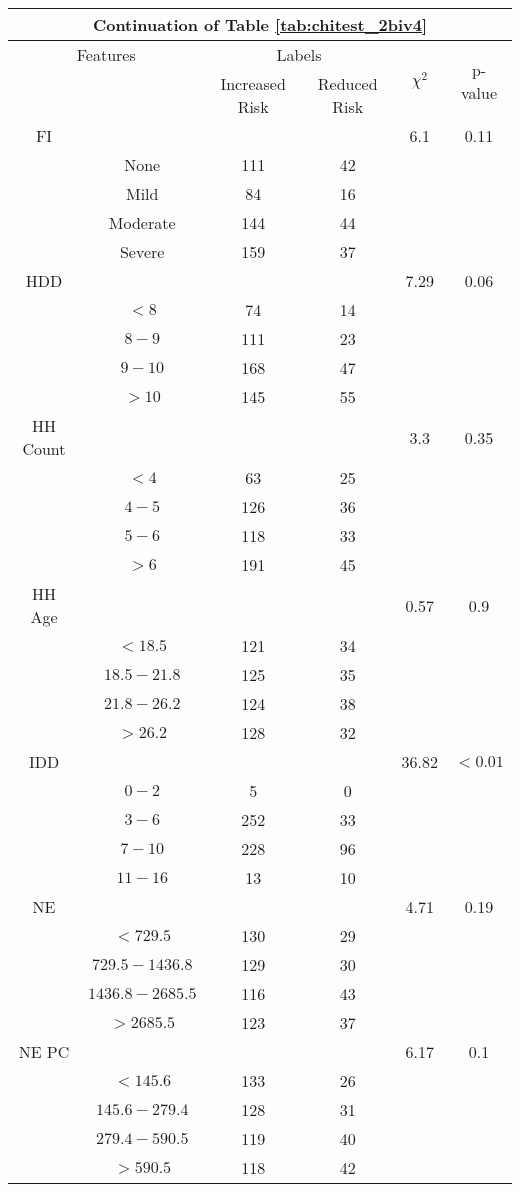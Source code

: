 \begin{table}
\centering
\label{tab:chitest_2biv4_cont}
\begin{tabular}{c c | c c| c | c}
\hline
\multicolumn{6}{c}{Continuation of Table \ref{tab:chitest_2biv4}}\\ 
\hline
\multicolumn{2}{c|}{Features}& \multicolumn{2}{c|}{Labels}& \multirow{2}{*}{$\chi^2$} & \multirow{2}{*}{p-value}\\ 
& & Increased Risk & Reduced Risk & & \\ 
\hline
FI &  &  & & 6.1 & 0.11 \\ 
& None & 111 & 42& & \\ 
& Mild & 84 & 16& & \\ 
& Moderate & 144 & 44& & \\ 
& Severe & 159 & 37& & \\ 
\hline 
HDD &  &  & & 7.29 & 0.06 \\ 
& $< 8$ & 74 & 14& & \\ 
& $8-9$ & 111 & 23& & \\ 
& $9-10$ & 168 & 47& & \\ 
& $> 10$ & 145 & 55& & \\ 
\hline 
HH Count &  &  & & 3.3 & 0.35 \\ 
& $< 4$ & 63 & 25& & \\ 
& $4-5$ & 126 & 36& & \\ 
& $5-6$ & 118 & 33& & \\ 
& $> 6$ & 191 & 45& & \\ 
\hline 
HH Age &  &  & & 0.57 & 0.9 \\ 
& $< 18.5$ & 121 & 34& & \\ 
& $18.5-21.8$ & 125 & 35& & \\ 
& $21.8-26.2$ & 124 & 38& & \\ 
& $> 26.2$ & 128 & 32& & \\ 
\hline 
IDD &  &  & & 36.82 & $< 0.01$ \\ 
& $0-2$ & 5 & 0& & \\ 
& $3-6$ & 252 & 33& & \\ 
& $7-10$ & 228 & 96& & \\ 
& $11-16$ & 13 & 10& & \\ 
\hline 
NE &  &  & & 4.71 & 0.19 \\ 
& $< 729.5$ & 130 & 29& & \\ 
& $729.5-1436.8$ & 129 & 30& & \\ 
& $1436.8-2685.5$ & 116 & 43& & \\ 
& $> 2685.5$ & 123 & 37& & \\ 
\hline 
NE PC &  &  & & 6.17 & 0.1 \\ 
& $< 145.6$ & 133 & 26& & \\ 
& $145.6-279.4$ & 128 & 31& & \\ 
& $279.4-590.5$ & 119 & 40& & \\ 
& $> 590.5$ & 118 & 42& & \\ 
\hline 
\end{tabular}
\end{table}

